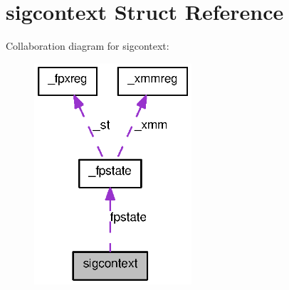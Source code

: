 \section{sigcontext Struct Reference}
\label{structsigcontext}


Collaboration diagram for sigcontext:
\nopagebreak
\begin{figure}[H]
\begin{center}
\leavevmode
\includegraphics[width=166pt]{structsigcontext__coll__graph}
\end{center}
\end{figure}
